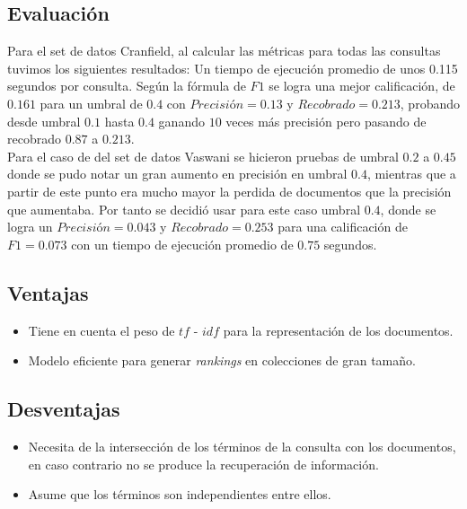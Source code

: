 \documentclass[spanish]{article}
\begin{document}
			\subsection*{Evaluación}

				Para el set de datos Cranfield, al calcular las métricas para todas las consultas tuvimos los siguientes resultados: 
				Un tiempo de ejecución promedio de unos 0.115 segundos por consulta. 
				Según la fórmula de $F1$ se logra una mejor calificación, de $0.161$ para un umbral de $0.4$ con $Precisión= 0.13$ y $Recobrado= 0.213$, probando desde umbral $0.1$ hasta $0.4$ 
				ganando $10$ veces más precisión pero pasando de recobrado $0.87$ a $0.213$.\\

				Para el caso de del set de datos Vaswani se hicieron pruebas de umbral $0.2$ a $0.45$ donde se pudo notar un gran aumento en precisión en umbral $0.4$, mientras que a partir de este punto era mucho mayor la perdida de documentos que la precisión que aumentaba.
				Por tanto se decidió usar para este caso umbral $0.4$, donde se logra un $Precisión= 0.043$ y $Recobrado=0.253$ para una calificación de $F1= 0.073$ con un tiempo de ejecución promedio de $0.75$ segundos.


			\subsection*{Ventajas}
				
				\begin{itemize}
					\item Tiene en cuenta el peso de $tf$ - $idf$ para la representación de los documentos.
					\item Modelo eficiente para generar \emph{rankings} en colecciones de gran tamaño.
				\end{itemize}	


			\subsection*{Desventajas}

			\begin{itemize}
				\item Necesita de la intersección de los términos de la consulta con los documentos, en caso contrario no se produce la recuperación de información.
				\item Asume que los términos son independientes entre ellos.
			\end{itemize}
\end{document}
